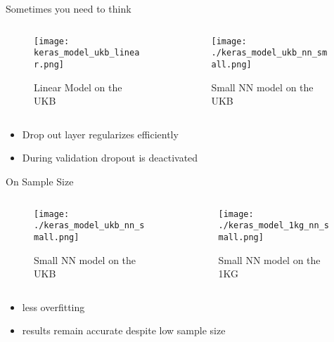 \documentclass{beamer}
\begin{document}
\begin{frame}[t]{Sometimes you need to think}
  \begin{columns}
    \begin{column}{0.5\textwidth}
      \begin{figure}[htpb]
        \centering
        \texttt{[image: keras\_model\_ukb\_linear.png]}
        \caption{Linear Model on the UKB}
      \end{figure}
    \end{column}
    \begin{column}{0.5\textwidth}
      \begin{figure}[htpb]
        \centering
        \texttt{[image: ./keras\_model\_ukb\_nn\_small.png]}
        \caption{Small NN model on the UKB}
      \end{figure}
    \end{column}
  \end{columns}
  \begin{itemize}
    \item Drop out layer regularizes efficiently
    \item During validation dropout is deactivated
  \end{itemize}
\end{frame}

\begin{frame}[t]{On Sample Size}
  \begin{columns}
    \begin{column}{0.5\textwidth}
      \begin{figure}[htpb]
        \centering
        \texttt{[image: ./keras\_model\_ukb\_nn\_small.png]}
        \caption{Small NN model on the UKB}
      \end{figure}
    \end{column}
    \begin{column}{0.5\textwidth}
      \begin{figure}[htpb]
        \centering
        \texttt{[image: ./keras\_model\_1kg\_nn\_small.png]}
        \caption{Small NN model on the 1KG}
      \end{figure}
    \end{column}
  \end{columns}
  \begin{itemize}
    \item less overfitting
    \item results remain accurate despite low sample size
  \end{itemize}
\end{frame}
\end{document}
